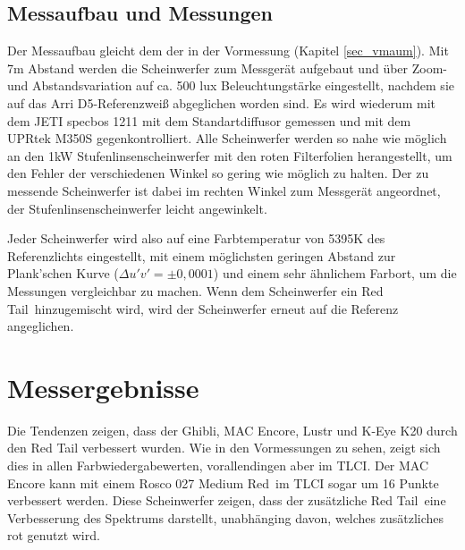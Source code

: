 \section{Messaufbau und Messungen}
\label{sec_hmaufbau}
Der Messaufbau gleicht dem der in der Vormessung (Kapitel \ref{sec_vmaum}). Mit 7m Abstand werden die Scheinwerfer zum Messgerät aufgebaut und über Zoom- und Abstandsvariation auf ca. 500 lux Beleuchtungstärke eingestellt, nachdem sie auf das Arri D5-Referenzweiß abgeglichen worden sind. Es wird wiederum mit dem JETI specbos 1211 mit dem Standartdiffusor gemessen und mit dem UPRtek M350S gegenkontrolliert. Alle Scheinwerfer werden so nahe wie möglich an den 1kW Stufenlinsenscheinwerfer mit den roten Filterfolien herangestellt, um den Fehler der verschiedenen Winkel so gering wie möglich zu halten. Der zu messende Scheinwerfer ist dabei im rechten Winkel zum Messgerät angeordnet, der Stufenlinsenscheinwerfer leicht angewinkelt. 


Jeder Scheinwerfer wird also auf eine Farbtemperatur von 5395K des Referenzlichts eingestellt, mit einem möglichsten geringen Abstand zur Plank'schen Kurve ($ \Delta u'v'=\pm0,0001$) und einem sehr ähnlichem Farbort, um die Messungen vergleichbar zu machen. Wenn dem Scheinwerfer ein \glqq Red Tail\grqq\ hinzugemischt wird, wird der Scheinwerfer erneut auf die Referenz angeglichen. 



\chapter{Messergebnisse}

Die Tendenzen zeigen, dass der Ghibli, MAC Encore, Lustr und K-Eye K20 durch den Red Tail verbessert wurden. Wie in den Vormessungen zu sehen, zeigt sich dies in allen Farbwiedergabewerten, vorallendingen aber im TLCI. Der MAC Encore kann mit einem Rosco 027 \glqq Medium Red\grqq\ im TLCI sogar um 16 Punkte verbessert werden. Diese Scheinwerfer zeigen, dass der zusätzliche \glqq Red Tail\grqq\ eine Verbesserung des Spektrums darstellt, unabhänging davon, welches zusätzliches rot genutzt wird. 


